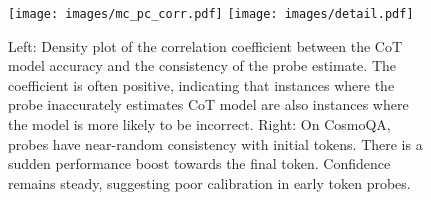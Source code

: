 \begin{figure}[ht]
    \centering \texttt{[image: images/mc\_pc\_corr.pdf]}
    \texttt{[image: images/detail.pdf]}
    \caption{Left: Density plot of the correlation coefficient between the CoT model accuracy and the consistency of the probe estimate. The coefficient is often positive, indicating that instances where the probe inaccurately estimates CoT model are also instances where the model is more likely to be incorrect. Right: On CosmoQA, probes have near-random consistency with initial tokens. There is a sudden performance boost towards the final token. Confidence remains steady, suggesting poor calibration in early token probes. }
    \label{fig:detail_mc_pc_corr}
\end{figure}